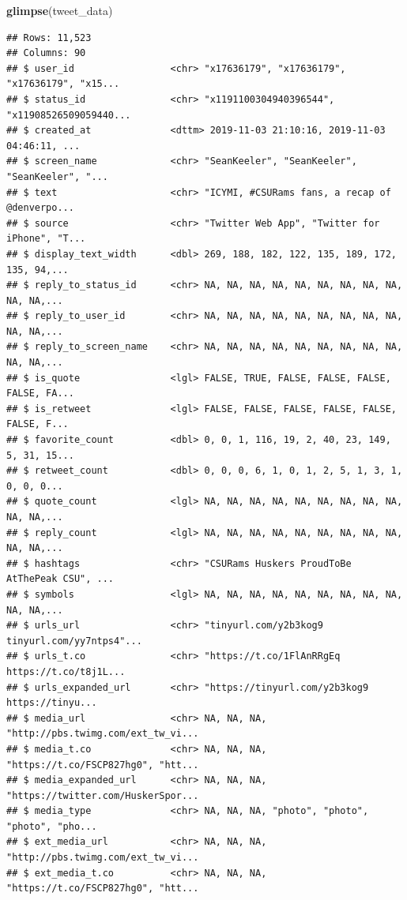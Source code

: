 \documentclass[
]{book}
\newenvironment{Shaded}{\begin{snugshade}}{\end{snugshade}}
\newcommand{\KeywordTok}[1]{\textcolor[rgb]{0.13,0.29,0.53}{\textbf{#1}}}
\newcommand{\NormalTok}[1]{#1}
\begin{document}
\begin{Shaded}
\begin{Highlighting}[]
\KeywordTok{glimpse}\NormalTok{(tweet_data)}
\end{Highlighting}
\end{Shaded}

\begin{verbatim}
## Rows: 11,523
## Columns: 90
## $ user_id                 <chr> "x17636179", "x17636179", "x17636179", "x15...
## $ status_id               <chr> "x1191100304940396544", "x11908526509059440...
## $ created_at              <dttm> 2019-11-03 21:10:16, 2019-11-03 04:46:11, ...
## $ screen_name             <chr> "SeanKeeler", "SeanKeeler", "SeanKeeler", "...
## $ text                    <chr> "ICYMI, #CSURams fans, a recap of @denverpo...
## $ source                  <chr> "Twitter Web App", "Twitter for iPhone", "T...
## $ display_text_width      <dbl> 269, 188, 182, 122, 135, 189, 172, 135, 94,...
## $ reply_to_status_id      <chr> NA, NA, NA, NA, NA, NA, NA, NA, NA, NA, NA,...
## $ reply_to_user_id        <chr> NA, NA, NA, NA, NA, NA, NA, NA, NA, NA, NA,...
## $ reply_to_screen_name    <chr> NA, NA, NA, NA, NA, NA, NA, NA, NA, NA, NA,...
## $ is_quote                <lgl> FALSE, TRUE, FALSE, FALSE, FALSE, FALSE, FA...
## $ is_retweet              <lgl> FALSE, FALSE, FALSE, FALSE, FALSE, FALSE, F...
## $ favorite_count          <dbl> 0, 0, 1, 116, 19, 2, 40, 23, 149, 5, 31, 15...
## $ retweet_count           <dbl> 0, 0, 0, 6, 1, 0, 1, 2, 5, 1, 3, 1, 0, 0, 0...
## $ quote_count             <lgl> NA, NA, NA, NA, NA, NA, NA, NA, NA, NA, NA,...
## $ reply_count             <lgl> NA, NA, NA, NA, NA, NA, NA, NA, NA, NA, NA,...
## $ hashtags                <chr> "CSURams Huskers ProudToBe AtThePeak CSU", ...
## $ symbols                 <lgl> NA, NA, NA, NA, NA, NA, NA, NA, NA, NA, NA,...
## $ urls_url                <chr> "tinyurl.com/y2b3kog9 tinyurl.com/yy7ntps4"...
## $ urls_t.co               <chr> "https://t.co/1FlAnRRgEq https://t.co/t8j1L...
## $ urls_expanded_url       <chr> "https://tinyurl.com/y2b3kog9 https://tinyu...
## $ media_url               <chr> NA, NA, NA, "http://pbs.twimg.com/ext_tw_vi...
## $ media_t.co              <chr> NA, NA, NA, "https://t.co/FSCP827hg0", "htt...
## $ media_expanded_url      <chr> NA, NA, NA, "https://twitter.com/HuskerSpor...
## $ media_type              <chr> NA, NA, NA, "photo", "photo", "photo", "pho...
## $ ext_media_url           <chr> NA, NA, NA, "http://pbs.twimg.com/ext_tw_vi...
## $ ext_media_t.co          <chr> NA, NA, NA, "https://t.co/FSCP827hg0", "htt...

\end{verbatim}
\end{document}
